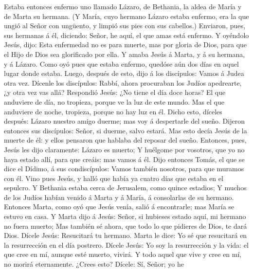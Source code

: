  Estaba entonces enfermo uno llamado Lázaro, de Bethania,
la aldea de María y de Marta su hermana.  (Y María, cuyo
hermano Lázaro estaba enfermo, era la que ungió al Señor con ungüento, y
limpió sus pies con sus cabellos.)  Enviaron, pues, sus
hermanas á él, diciendo: Señor, he aquí, el que amas está enfermo.
 Y oyéndolo Jesús, dijo: Esta enfermedad no es para
muerte, mas por gloria de Dios, para que el Hijo de Dios sea glorificado
por ella.  Y amaba Jesús á Marta, y á su hermana, y á
Lázaro.  Como oyó pues que estaba enfermo, quedóse aún dos
días en aquel lugar donde estaba.  Luego, después de esto,
dijo á los discípulos: Vamos á Judea otra vez.  Dícenle
los discípulos: Rabbí, ahora procuraban los Judíos apedrearte, ¿y otra
vez vas allá?  Respondió Jesús: ¿No tiene el día doce
horas? El que anduviere de día, no tropieza, porque ve la luz de este
mundo.  Mas el que anduviere de noche, tropieza, porque
no hay luz en él.  Dicho esto, díceles después: Lázaro
nuestro amigo duerme; mas voy á despertarle del sueño. 
Dijeron entonces sus discípulos: Señor, si duerme, salvo estará.
 Mas esto decía Jesús de la muerte de él: y ellos
pensaron que hablaba del reposar del sueño.  Entonces,
pues, Jesús les dijo claramente: Lázaro es muerto;  Y
huélgome por vosotros, que yo no haya estado allí, para que creáis: mas
vamos á él.  Dijo entonces Tomás, el que se dice el
Dídimo, á sus condiscípulos: Vamos también nosotros, para que muramos
con él.  Vino pues Jesús, y halló que había ya cuatro
días que estaba en el sepulcro.  Y Bethania estaba cerca
de Jerusalem, como quince estadios;  Y muchos de los
Judíos habían venido á Marta y á María, á consolarlas de su hermano.
 Entonces Marta, como oyó que Jesús venía, salió á
encontrarle; mas María se estuvo en casa.  Y Marta dijo á
Jesús: Señor, si hubieses estado aquí, mi hermano no fuera muerto;
 Mas también sé ahora, que todo lo que pidieres de Dios,
te dará Dios.  Dícele Jesús: Resucitará tu hermano.
 Marta le dice: Yo sé que resucitará en la resurrección
en el día postrero.  Dícele Jesús: Yo soy la resurrección
y la vida: el que cree en mí, aunque esté muerto, vivirá.
 Y todo aquel que vive y cree en mí, no morirá
eternamente. ¿Crees esto?  Dícele: Sí, Señor; yo he
